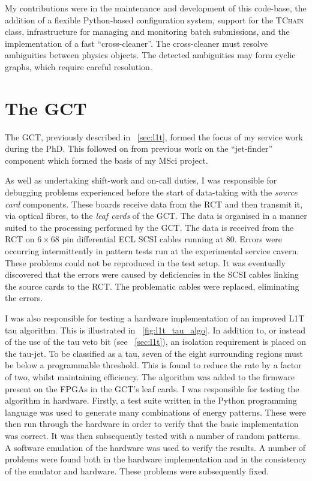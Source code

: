 My contributions were in the maintenance and development of this code-base, the
addition of a flexible Python-based configuration system, support for the \root
\textsc{TChain} class, infrastructure for managing and monitoring batch
submissions, and the implementation of a fast ``cross-cleaner''. The
cross-cleaner must resolve ambiguities between physics objects. The detected
ambiguities may form cyclic graphs, which require careful resolution.

\section{The \acl{GCT}}
\label{sec:gct}
The \acf{GCT}, previously described in \sec~\ref{sec:l1t}, formed the focus of
my service work during the PhD. This followed on from previous work on the
``jet-finder'' component which formed the basis of my MSci project.

As well as undertaking shift-work and on-call duties, I was responsible for
debugging problems experienced before the start of data-taking with the
\emph{source card} components. These boards receive data from the \ac{RCT} and
then transmit it, via optical fibres, to the \emph{leaf cards} of the
\ac{GCT}. The data is organised in a manner suited to the processing performed
by the \ac{GCT}. The data is received from the \ac{RCT} on $6\times 68$ pin
differential \ac{ECL} \ac{SCSI} cables running at \unit{80}{\mega\hertz}. Errors
were occurring intermittently in pattern tests run at the experimental service
cavern. These problems could not be reproduced in the test setup. It was
eventually discovered that the errors were caused by deficiencies in the
\ac{SCSI} cables linking the source cards to the \ac{RCT}. The problematic
cables were replaced, eliminating the errors.

I was also responsible for testing a hardware implementation of an improved
\ac{L1T} tau algorithm. This is illustrated in \fig~\ref{fig:l1t_tau_algo}. In
addition to, or instead of the use of the tau veto bit (see \sec~\ref{sec:l1t}),
an isolation requirement is placed on the tau-jet. To be classified as a tau,
seven of the eight surrounding regions must be below a programmable
threshold. This is found to reduce the rate by a factor of two, whilst
maintaining efficiency. The algorithm was added to the firmware present on the
\acp{FPGA} in the \ac{GCT}'s leaf cards. I was responsible for testing the
algorithm in hardware. Firstly, a test suite written in the Python programming
language was used to generate many combinations of energy patterns. These were
then run through the hardware in order to verify that the basic implementation
was correct. It was then subsequently tested with a number of random patterns. A
software emulation of the hardware was used to verify the results. A number of
problems were found both in the hardware implementation and in the consistency
of the emulator and hardware. These problems were subsequently fixed.

